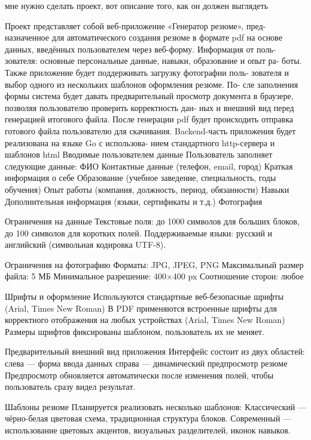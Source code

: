 \documentclass[a4paper, 14pt]{extarticle} %
\begin{document}
\begin{PromptBlock}

мне нужно сделать проект, вот описание того, как он должен выглядеть

Проект представляет собой веб-приложение «Генератор резюме», пред-
назначенное для автоматического создания резюме в формате pdf на основе
данных, введённых пользователем через веб-форму. Информация от поль-
зователя: основные персональные данные, навыки, образование и опыт ра-
боты. Также приложение будет поддерживать загрузку фотографии поль-
зователя и выбор одного из нескольких шаблонов оформления резюме. По-
сле заполнения формы система будет давать предварительный просмотр
документа в браузере, позволяя пользователю проверить корректность дан-
ных и внешний вид перед генерацией итогового файла. После генерации pdf
будет происходить отправка готового файла пользователю для скачивания.
Backend-часть приложения будет реализована на языке Go с использова-
нием стандартного http-сервера и шаблонов html
Вводимые пользователем данные
Пользователь заполняет следующие данные:
ФИО
Контактные данные (телефон, email, город)
Краткая информация о себе
Образование (учебное заведение, специальность, годы обучения)
Опыт работы (компания, должность, период, обязанности)
Навыки
Дополнительная информация (языки, сертификаты и т.д.)
Фотография

Ограничения на данные
Текстовые поля: до 1000 символов для больших блоков, до 100 символов для коротких полей.
Поддерживаемые языки: русский и английский (символьная кодировка UTF-8).

Ограничения на фотографию
Форматы: JPG, JPEG, PNG
Максимальный размер файла: 5 МБ
Минимальное разрешение: 400×400 px
Соотношение сторон: любое 

Шрифты и оформление
Используются стандартные веб-безопасные шрифты (Arial, Times New Roman)
В PDF применяются встроенные шрифты для корректного отображения на любых устройствах (Arial, Times New Roman)
Размеры шрифтов фиксированы шаблоном, пользователь их не меняет.

Предварительный внешний вид приложения
Интерфейс состоит из двух областей:
слева — форма ввода данных
справа — динамический предпросмотр резюме
Предпросмотр обновляется автоматически после изменения полей, чтобы пользователь сразу видел результат.

Шаблоны резюме
Планируется реализовать несколько шаблонов:
Классический — чёрно-белая цветовая схема, традиционная структура блоков.
Современный — использование цветовых акцентов, визуальных разделителей, иконок навыков.


\end{PromptBlock}
\end{document}
